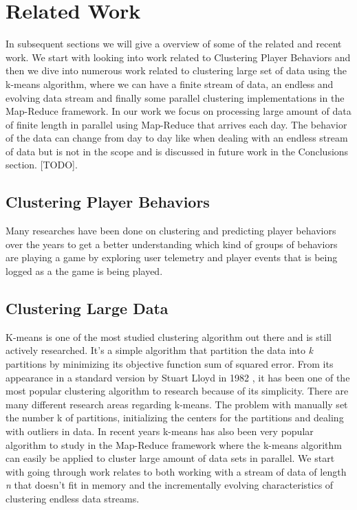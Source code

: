 
\chapter{Related Work} %
\label{Chapter3}

In subsequent sections we will give a overview of some of the related and recent work. We start with looking into work related to Clustering Player Behaviors and then we dive into numerous work related to clustering large set of data using the k-means algorithm, where we can have a finite stream of data, an endless and evolving data stream and finally some parallel clustering implementations in the Map-Reduce framework. In our work we focus on processing large amount of data of finite length in parallel using Map-Reduce that arrives each day. The behavior of the data can change from day to day like when dealing with an endless stream of data but is not in the scope and is discussed in future work in the Conclusions section. [TODO].

\section{Clustering Player Behaviors}
Many researches have been done on clustering and predicting player behaviors over the years to get a better understanding which kind of groups of behaviors are playing a game by exploring user telemetry and player events that is being logged as a the game is being played.

\section{Clustering Large Data}
K-means is one of the most studied clustering algorithm out there and is still actively researched. It's a simple algorithm that partition the data into \textit{k} partitions by minimizing its objective function sum of squared error. From its appearance in a standard version by Stuart Lloyd in 1982 \citep{Lloyd:1982} , it has been one of the most popular clustering algorithm to research because of its simplicity. There are many different research areas regarding k-means. The problem with manually set the number k of partitions, initializing the centers for the partitions and dealing with outliers in data. In recent years k-means has also been very popular algorithm to study in the Map-Reduce framework where the k-means algorithm can easily be applied to cluster large amount of data sets in parallel. We start with going through work relates to both working with a stream of data of length \textit{n} that doesn't fit in memory and the incrementally evolving characteristics of clustering endless data streams.

